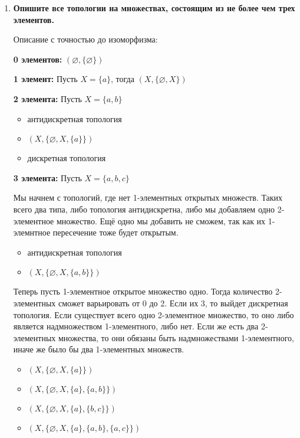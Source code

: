 \documentclass{article}
\begin{document}
\begin{enumerate}
    \item \textbf{Опишите все топологии на множествах, состоящим из не более
        чем трех элементов.}\par
        Описание с точностью до изоморфизма:\par
        \textbf{0 элементов:} $(\varnothing, \{\varnothing\})$\par
        \textbf{1 элемент:} Пусть $X = \{a\}$, тогда $(X, \{\varnothing, X\})$
        \par
        \textbf{2 элемента:} Пусть $X = \{a, b\}$
        \begin{itemize}
            \item антидискретная топология
            \item $(X, \{\varnothing, X, \{a\}\})$
            \item дискретная топология
        \end{itemize}\par
        \textbf{3 элемента:} Пусть $X = \{a, b, c\}$
        \par Мы начнем с топологий, где нет 1-элементных открытых множеств.
        Таких всего два типа, либо топология антидискретна, либо мы добавляем
        одно 2-элементное множество. Ещё одно мы добавить не сможем, так как
        их 1-элемнтное пересечение тоже будет открытым.
        \begin{itemize}
            \item антидискретная топология
            \item $(X, \{\varnothing, X, \{a, b\}\})$
        \end{itemize}
        Теперь пусть 1-элементное открытое множество одно. Тогда количество
        2-элементных сможет варьировать от 0 до 2. Если их 3, то выйдет
        дискретная топология. Если существует всего одно 2-элементное множество,
        то оно либо является надмножеством 1-элементного, либо нет. Если же
        есть два 2-элементных множества, то они обязаны быть надмножествами
        1-элементного, иначе же было бы два 1-элементных множеств.
        \begin{itemize}
            \item $(X, \{\varnothing, X, \{a\}\})$
            \item $(X, \{\varnothing, X, \{a\}, \{a, b\}\})$
            \item $(X, \{\varnothing, X, \{a\}, \{b, c\}\})$
            \item $(X, \{\varnothing, X, \{a\}, \{a, b\}, \{a, c\}\})$
        \end{itemize}

\end{enumerate}
\end{document}

